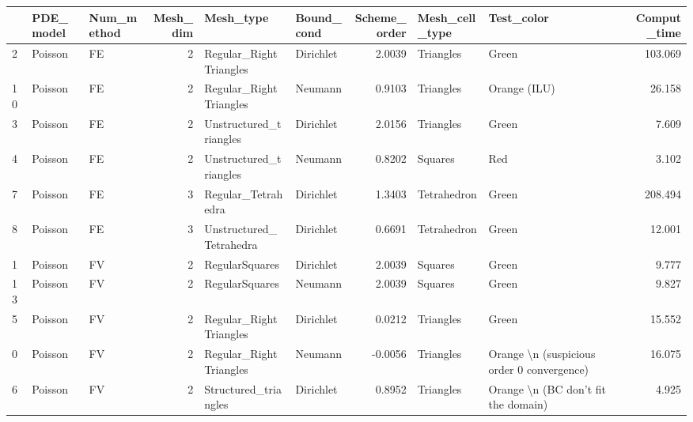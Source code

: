 \begin{tabular}{lllrllrllr}
\toprule
{} & PDE\_model & Num\_method &  Mesh\_dim &                Mesh\_type & Bound\_cond &  Scheme\_order & Mesh\_cell\_type &                                  Test\_color &  Comput\_time \\
\midrule
2  &   Poisson &         FE &         2 &   Regular\_RightTriangles &  Dirichlet &        2.0039 &      Triangles &                                       Green &      103.069 \\
10 &   Poisson &         FE &         2 &   Regular\_RightTriangles &    Neumann &        0.9103 &      Triangles &                                Orange (ILU) &       26.158 \\
3  &   Poisson &         FE &         2 &   Unstructured\_triangles &  Dirichlet &        2.0156 &      Triangles &                                       Green &        7.609 \\
4  &   Poisson &         FE &         2 &   Unstructured\_triangles &    Neumann &        0.8202 &        Squares &                                         Red &        3.102 \\
7  &   Poisson &         FE &         3 &       Regular\_Tetrahedra &  Dirichlet &        1.3403 &    Tetrahedron &                                       Green &      208.494 \\
8  &   Poisson &         FE &         3 &  Unstructured\_Tetrahedra &  Dirichlet &        0.6691 &    Tetrahedron &                                       Green &       12.001 \\
1  &   Poisson &         FV &         2 &           RegularSquares &  Dirichlet &        2.0039 &        Squares &                                       Green &        9.777 \\
13 &   Poisson &         FV &         2 &           RegularSquares &    Neumann &        2.0039 &        Squares &                                       Green &        9.827 \\
5  &   Poisson &         FV &         2 &   Regular\_RightTriangles &  Dirichlet &        0.0212 &      Triangles &                                       Green &       15.552 \\
0  &   Poisson &         FV &         2 &   Regular\_RightTriangles &    Neumann &       -0.0056 &      Triangles &  Orange \textbackslash n (suspicious order 0 convergence) &       16.075 \\
6  &   Poisson &         FV &         2 &     Structured\_triangles &  Dirichlet &        0.8952 &      Triangles &         Orange \textbackslash n (BC don't fit the domain) &        4.925 \\

\end{tabular}
